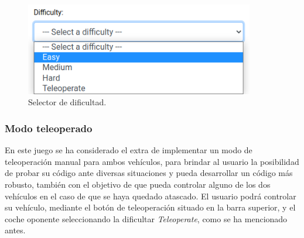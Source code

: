 \documentclass[a4paper, 12pt]{book}
\begin{document}
\begin{figure}[H]
	\centering
    \includegraphics[width=10cm]{img/difficulty_selector.png}
    \caption{Selector de dificultad.}
    \label{figura:difficulty_selector}
\end{figure}

\subsubsection{Modo teleoperado}
\label{follow_line_game_mode_teleoperado}

En este juego se ha considerado el extra de implementar un modo de teleoperación manual para ambos vehículos, para brindar al usuario la posibilidad de probar su código ante diversas situaciones y pueda desarrollar un código más robusto, también con el objetivo de que pueda controlar alguno de los dos vehículos en el caso de que se haya quedado atascado. El usuario podrá controlar su vehículo, mediante el botón de teleoperación situado en la barra superior, y el coche oponente seleccionando la dificultar \emph{Teleoperate}, como se ha mencionado antes.
\end{document}
